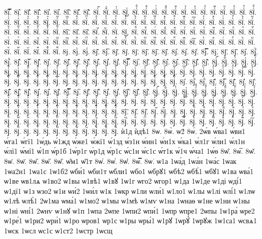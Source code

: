 {8ї҆̿.
8ї҆͘.
8ї҆҃.
8ї҆҄.
8ї҆҅.
8ї҆҆.
8ї҆҇.
8ї҆᷀.
8ї҆᷁.
8ї҆᷶.
8ї᷷҆.
8ї᷸҆.
8ї᷹҆.
8ї҆ⷠ.
8ї҆ⷡ.
8ї҆ⷢ.
8ї҆ⷣ.
8ї҆ⷤ.
8ї҆ⷥ.
8ї҆ⷦ.
8ї҆ⷧ.
8ї҆ⷨ.
8ї҆ⷩ.
8ї҆ⷪ.
8ї҆ⷫ.
8ї҆ⷬ.
8ї҆ⷭ.
8ї҆ⷮ.
8ї҆ⷯ.
8ї҆ⷰ.
8ї҆ⷱ.
8ї҆ⷲ.
8ї҆ⷳ.
8ї҆ⷴ.
8ї҆ⷵ.
8ї҆ⷶ.
8ї҆ⷷ.
8ї҆ⷸ.
8ї҆ⷹ.
8ї҆ⷺ.
8ї҆ⷻ.
8ї҆ⷼ.
8ї҆ⷽ.
8ї҆ⷾ.
8ї҆ⷿ.
8ї҆꙯.
8ї҆ꙴ.
8ї҆ꙵ.
8ї҆ꙶ.
8ї҆ꙷ.
8ї҆ꙸ.
8ї҆ꙹ.
8ї҆ꙺ.
8ї҆ꙻ.
8ї҆꙼.
8ї҆꙽.
8ї҆ꚞ.
8ї҆ꚟ.
8ї҇.
8ї᷀.
8ї᷁.
8ї᷶.
8ї᷷.
8ї᷸.
8ї᷹.
8їⷠ.
8їⷡ.
8їⷢ.
8їⷣ.
8їⷤ.
8їⷥ.
8їⷦ.
8їⷧ.
8їⷨ.
8їⷩ.
8їⷪ.
8їⷫ.
8їⷬ.
8їⷭ.
8їⷮ.
8їⷯ.
8їⷰ.
8їⷱ.
8їⷲ.
8їⷳ.
8їⷴ.
8їⷵ.
8їⷶ.
8їⷷ.
8їⷸ.
8їⷹ.
8їⷺ.
8їⷻ.
8їⷼ.
8їⷽ.
8їⷾ.
8їⷿ.
8ї꙯.
8їꙴ.
8їꙵ.
8їꙶ.
8їꙷ.
8їꙸ.
8їꙹ.
8їꙺ.
8їꙻ.
8ї꙼.
8ї꙽.
8їꚞ.
8їꚟ.
8ј.
8ј̀.
8ј́.
8ј̂.
8ј̅.
8ј̆.
8ј̇.
8ј̈.
8ј̋.
8ј̏.
8ј̑.
8ј̓.
8ј̔.
8ј̾.
8ј̿.
8ј͘.
8ј҃.
8ј҄.
8ј҅.
8ј҅̀.
8ј҅́.
8ј҅̂.
8ј҅̅.
8ј҅̆.
8ј҅̇.
8ј҅̈.
8ј҅̋.
8ј҅̏.
8ј҅̑.
8ј҅̓.
8ј҅̔.
8ј҅̾.
8ј҅̿.
8ј҅͘.
8ј҅҃.
8ј҅҄.
8ј҅҅.
8ј҅҆.
8ј҅҇.
8ј҅᷀.
8ј҅᷁.
8ј҅᷶.
8ј᷷҅.
8ј᷸҅.
8ј᷹҅.
8ј҅ⷠ.
8ј҅ⷡ.
8ј҅ⷢ.
8ј҅ⷣ.
8ј҅ⷤ.
8ј҅ⷥ.
8ј҅ⷦ.
8ј҅ⷧ.
8ј҅ⷨ.
8ј҅ⷩ.
8ј҅ⷪ.
8ј҅ⷫ.
8ј҅ⷬ.
8ј҅ⷭ.
8ј҅ⷮ.
8ј҅ⷯ.
8ј҅ⷰ.
8ј҅ⷱ.
8ј҅ⷲ.
8ј҅ⷳ.
8ј҅ⷴ.
8ј҅ⷵ.
8ј҅ⷶ.
8ј҅ⷷ.
8ј҅ⷸ.
8ј҅ⷹ.
8ј҅ⷺ.
8ј҅ⷻ.
8ј҅ⷼ.
8ј҅ⷽ.
8ј҅ⷾ.
8ј҅ⷿ.
8ј҅꙯.
8ј҅ꙴ.
8ј҅ꙵ.
8ј҅ꙶ.
8ј҅ꙷ.
8ј҅ꙸ.
8ј҅ꙹ.
8ј҅ꙺ.
8ј҅ꙻ.
8ј҅꙼.
8ј҅꙽.
8ј҅ꚞ.
8ј҅ꚟ.
8ј҆.
8ј҆̀.
8ј҆́.
8ј҆̂.
8ј҆̅.
8ј҆̆.
8ј҆̇.
8ј҆̈.
8ј҆̋.
8ј҆̏.
8ј҆̑.
8ј҆̓.
8ј҆̔.
8ј҆̾.
8ј҆̿.
8ј҆͘.
8ј҆҃.
8ј҆҄.
8ј҆҅.
8ј҆҆.
8ј҆҇.
8ј҆᷀.
8ј҆᷁.
8ј҆᷶.
8ј᷷҆.
8ј᷸҆.
8ј᷹҆.
8ј҆ⷠ.
8ј҆ⷡ.
8ј҆ⷢ.
8ј҆ⷣ.
8ј҆ⷤ.
8ј҆ⷥ.
8ј҆ⷦ.
8ј҆ⷧ.
8ј҆ⷨ.
8ј҆ⷩ.
8ј҆ⷪ.
8ј҆ⷫ.
8ј҆ⷬ.
8ј҆ⷭ.
8ј҆ⷮ.
8ј҆ⷯ.
8ј҆ⷰ.
8ј҆ⷱ.
8ј҆ⷲ.
8ј҆ⷳ.
8ј҆ⷴ.
8ј҆ⷵ.
8ј҆ⷶ.
8ј҆ⷷ.
8ј҆ⷸ.
8ј҆ⷹ.
8ј҆ⷺ.
8ј҆ⷻ.
8ј҆ⷼ.
8ј҆ⷽ.
8ј҆ⷾ.
8ј҆ⷿ.
8ј҆꙯.
8ј҆ꙴ.
8ј҆ꙵ.
8ј҆ꙶ.
8ј҆ꙷ.
8ј҆ꙸ.
8ј҆ꙹ.
8ј҆ꙺ.
8ј҆ꙻ.
8ј҆꙼.
8ј҆꙽.
8ј҆ꚞ.
8ј҆ꚟ.
8ј҇.
8ј᷀.
8ј᷁.
8ј᷶.
8ј᷷.
8ј᷸.
8ј᷹.
8јⷠ.
8јⷡ.
8јⷢ.
8јⷣ.
8јⷤ.
8јⷥ.
8јⷦ.
8јⷧ.
8јⷨ.
8јⷩ.
8јⷪ.
8јⷫ.
8јⷬ.
8јⷭ.
8јⷮ.
8јⷯ.
8јⷰ.
8јⷱ.
8јⷲ.
8јⷳ.
8јⷴ.
8јⷵ.
8јⷶ.
8јⷷ.
8јⷸ.
8јⷹ.
8јⷺ.
8јⷻ.
8јⷼ.
8јⷽ.
8јⷾ.
8јⷿ.
8ј꙯.
8јꙴ.
8јꙵ.
8јꙶ.
8јꙷ.
8јꙸ.
8јꙹ.
8јꙺ.
8јꙻ.
8ј꙼.
8ј꙽.
8јꚞ.
8јꚟ.
ѝ1д
ѝдѣ1
8ѡ.
8ѡ̀.
ѡ2́
8ѡ́.
2ѡ́в
ѡ́ва1
ѡ́ви1
ѡ́га1
ѡ́гї1
1ѡ́дь
ѡ́1жд
ѡ́же1
ѡ́жї1
ѡ́1зд
ѡ́з1н
ѡ́ин1
ѡ́и1х
ѡ́ка1
ѡ́л1г
ѡ́ли1
ѡ́л1н
ѡ́лї1
ѡ́мї1
ѡ́1п
ѡ́р1б
1ѡ́р1г
ѡ́р1д
ѡ́р1с
ѡ́с1н
ѡ́с1с
ѡ́т1к
ѡ́1ч
ѡ́ча1
1ѡ́ѳ
8ѡ̂.
8ѡ̅.
8ѡ̆.
8ѡ̇.
8ѡ̈.
8ѡ̋.
8ѡ̏.
8ѡ̑.
ѡ̑м1
ѡ̑1т
8ѡ̓.
8ѡ̔.
8ѡ̾.
8ѡ̿.
8ѡ͘.
ѡ1а
1ѡа́д
1ѡа́н
1ѡа́с
1ѡак
1ѡа2н1
1ѡа1с
1ѡ1б2
ѡби́1
ѡби1т
ѡбли1
ѡбо1
ѡбрꙋ1
ѡбѣ2
ѡбѣ́1
ѡбꙋ1
ѡ1ва
ѡва́1
ѡ1ве
ѡв1лѧ
ѡ1во2
ѡ1вы
ѡ1вѣ1
ѡ1вꙋ
1ѡ1г
ѡго2
ѡгор1
ѡ1да
1ѡ1де
ѡ1ді
ѡді́1
ѡ1дї1
ѡ1з
ѡзо2
ѡ1и
ѡи́2
1ѡи́л
ѡ1к
1ѡкр
ѡ1ли
ѡли́1
ѡ1ло1
ѡ1лы
ѡ1лі
ѡлі́1
ѡ1лѡ
ѡ1лѣ
ѡлѣ́1
2ѡ1ма
ѡма́1
ѡ1мо2
ѡ1мы
ѡ1мѣ
ѡ1мѵ
ѡ1на
1ѡнаѳ
ѡ1не
ѡ1ни
ѡ1ны
ѡ1ні
ѡні́1
2ѡнѵ
ѡ1нꙋ
ѡ1п
1ѡпа
2ѡпе
1ѡпи2
ѡпи́1
1ѡпр
ѡпре1
2ѡпы
1ѡ1ра́
ѡре2
ѡ1ре́1
ѡ1ри2
ѡри́1
ѡ1ро
ѡров1
ѡр1с
ѡ1ры
ѡры́1
ѡ1рꙋ
1ѡрꙋ́
1ѡрꙋж
1ѡ1са1
ѡсвѧ1
1ѡск
1ѡсл
ѡс1с
ѡ1ст2
1ѡстр
1ѡсщ
}

